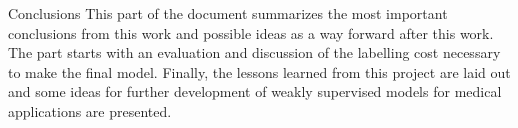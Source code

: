 \begin{partwithabstract}{Conclusions}
    This part of the document summarizes the most important conclusions from this work and possible ideas as a way forward after this work.
    The part starts with an evaluation and discussion of the labelling cost necessary to make the final model. 
    Finally, the lessons learned from this project are laid out and some ideas for further development of weakly supervised models for medical applications are presented. 
\end{partwithabstract}
\restoregeometry

